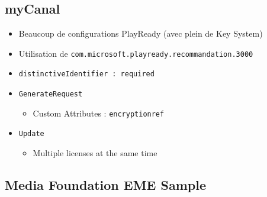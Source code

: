 \documentclass[french]{article}
\begin{document}
\subsection{myCanal}

\begin{itemize}
	\item Beaucoup de configurations PlayReady (avec plein de Key System)
	\item Utilisation de \texttt{com.microsoft.playready.recommandation.3000}
	\item \texttt{distinctiveIdentifier : required}
	\item \texttt{GenerateRequest}
	\begin{itemize}
		\item Custom Attributes : \texttt{encryptionref}
	\end{itemize}
	\item \texttt{Update}
	\begin{itemize}
		\item Multiple licenses at the same time
	\end{itemize}
\end{itemize}


\subsection{Media Foundation EME Sample}
\end{document}
